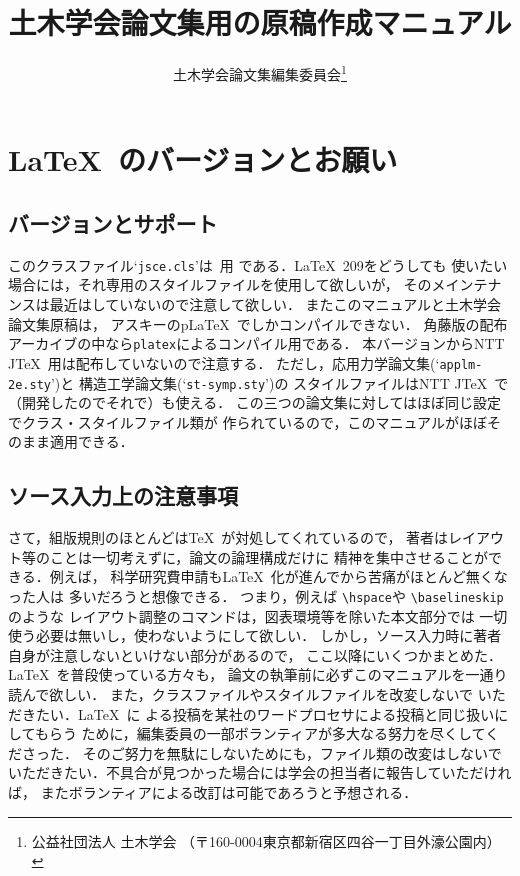 \documentclass[dvipdfmx,onecolumn]{jsce}  %
\title{土木学会論文集用の原稿作成マニュアル}
\author{土木学会論文集編集委員会\thanks{公益社団法人 土木学会
（〒160-0004東京都新宿区四谷一丁目外濠公園内）\email{03-3355-3441}}}
\begin{document}
\maketitle

\renewcommand{\baselinestretch}{0.95}\small
\begin{quote}
\tableofcontents
\end{quote}
\renewcommand{\baselinestretch}{1}\small\normalsize

\section{\LaTeX\ のバージョンとお願い}
\label{sec:1}

\subsection{バージョンとサポート}

このクラスファイル`{\tt jsce.cls}'は\LaTeXe\ 用
である．\LaTeX\ 209をどうしても
使いたい場合には，それ専用のスタイルファイルを使用して欲しいが，
そのメインテナンスは最近はしていないので注意して欲しい．
またこのマニュアルと土木学会論文集原稿は，
アスキーのp\LaTeX\ でしかコンパイルできない．
角藤版の配布アーカイブの中なら{\tt platex}によるコンパイル用である．
本バージョンからNTT J\TeX\ 用は配布していないので注意する．
ただし，応用力学論文集(`{\tt applm-2e.sty}')と
構造工学論文集(`{\tt st-symp.sty}')の
スタイルファイルはNTT J\TeX\ で（開発したのでそれで）も使える．
この三つの論文集に対してはほぼ同じ設定でクラス・スタイルファイル類が
作られているので，このマニュアルがほぼそのまま適用できる．

\subsection{ソース入力上の注意事項}

さて，組版規則のほとんどは\TeX\ が対処してくれているので，
著者はレイアウト等のことは一切考えずに，論文の論理構成だけに
精神を集中させることができる．例えば，
科学研究費申請も\LaTeX\ 化が進んでから苦痛がほとんど無くなった人は
多いだろうと想像できる．
つまり，例えば \verb+\hspace+や \verb+\baselineskip+のような
レイアウト調整のコマンドは，図表環境等を除いた本文部分では
一切使う必要は無いし，使わないようにして欲しい．
しかし，ソース入力時に著者自身が注意しないといけない部分があるので，
ここ以降にいくつかまとめた．\LaTeX\ を普段使っている方々も，
論文の執筆前に必ずこのマニュアルを一通り読んで欲しい．
また，クラスファイルやスタイルファイルを改変しないで
いただきたい．\LaTeX\ に
よる投稿を某社のワードプロセサによる投稿と同じ扱いにしてもらう
ために，編集委員の一部ボランティアが多大なる努力を尽くしてくださった．
そのご努力を無駄にしないためにも，ファイル類の改変はしないで
いただきたい．不具合が見つかった場合には学会の担当者に報告していただければ，
またボランティアによる改訂は可能であろうと予想される．
\end{document}

